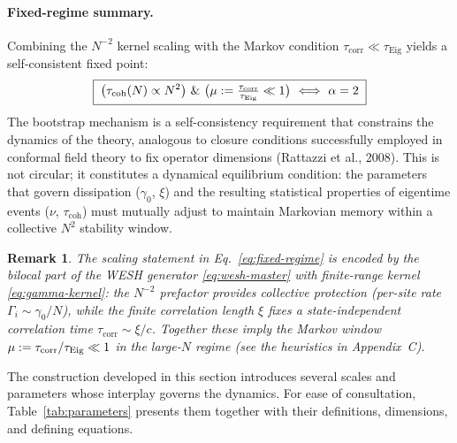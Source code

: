 \documentclass[12pt,a4paper]{article}
\newtheorem{remark}{Remark}[section]
\numberwithin{equation}{section}
\begin{document}
\paragraph{Fixed-regime summary.}
Combining the $N^{-2}$ kernel scaling with the Markov condition
$\tau_{\mathrm{corr}} \ll \tau_{\mathrm{Eig}}$ yields a self-consistent
fixed point:
\begin{equation}
\boxed{\;
\big(\tau_{\mathrm{coh}}(N)\propto N^2\big)\ \&\
\big(\mu:=\tfrac{\tau_{\mathrm{corr}}}{\tau_{\rm Eig}}\ll 1\big)
\ \Longleftrightarrow\ \alpha=2
\;}
\label{eq:fixed-regime}
\end{equation}
The bootstrap mechanism is a self-consistency requirement 
that constrains the dynamics of the theory, analogous to closure conditions 
successfully employed in conformal field theory to fix operator dimensions 
(Rattazzi et al., 2008). This is not circular; it constitutes a 
dynamical equilibrium condition: the parameters that govern dissipation 
($\gamma_0$, $\xi$) and the resulting statistical properties of eigentime 
events ($\nu$, $\tau_{\mathrm{coh}}$) must mutually adjust to maintain 
Markovian memory within a collective $N^2$ stability window.

\begin{remark}
The scaling statement in Eq.~\eqref{eq:fixed-regime} is encoded by the
bilocal part of the WESH generator \eqref{eq:wesh-master} with finite-range kernel
\eqref{eq:gamma-kernel}: the $N^{-2}$ prefactor provides collective
protection (per-site rate $\Gamma_i\!\sim\!\gamma_0/N$), while the finite
correlation length $\xi$ fixes a state-independent correlation time
$\tau_{\mathrm{corr}}\!\sim\!\xi/c$. Together these imply the Markov window
$\mu:=\tau_{\mathrm{corr}}/\tau_{\rm Eig}\ll 1$ in the large-$N$ regime
(see the heuristics in Appendix~C).
\end{remark}

\noindent The construction developed in this section introduces several 
scales and parameters whose interplay governs the dynamics. 
For ease of consultation, Table~\ref{tab:parameters} presents 
them together with their definitions, dimensions, and defining equations.
\end{document}
